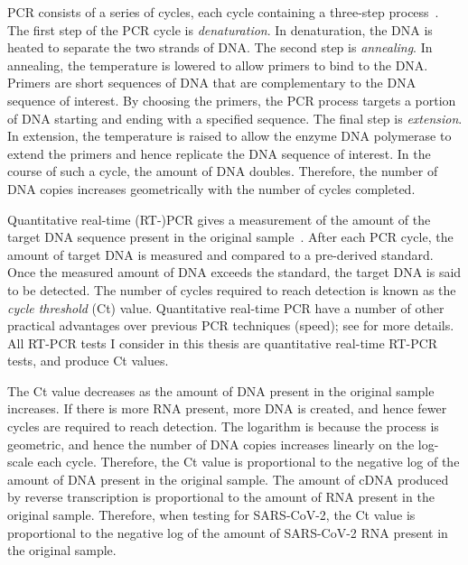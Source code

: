 \documentclass[thesis.tex]{subfiles}
\begin{document}
PCR consists of a series of cycles, each cycle containing a three-step process~\autocite{powledgePCR,garibyanPCR}.
The first step of the PCR cycle is \emph{denaturation}.
In denaturation, the DNA is heated to separate the two strands of DNA.
The second step is \emph{annealing}.
In annealing, the temperature is lowered to allow primers to bind to the DNA.
Primers are short sequences of DNA that are complementary to the DNA sequence of interest.
By choosing the primers, the PCR process targets a portion of DNA starting and ending with a specified sequence.
The final step is \emph{extension}.
In extension, the temperature is raised to allow the enzyme DNA polymerase to extend the primers and hence replicate the DNA sequence of interest.
In the course of such a cycle, the amount of DNA doubles.
Therefore, the number of DNA copies increases geometrically with the number of cycles completed.

Quantitative real-time (RT-)PCR gives a measurement of the amount of the target DNA sequence present in the original sample~\autocite{yangPCRdiagnostics}.
After each PCR cycle, the amount of target DNA is measured and compared to a pre-derived standard.
Once the measured amount of DNA exceeds the standard, the target DNA is said to be detected.
The number of cycles required to reach detection is known as the \emph{cycle threshold} (Ct) value.
Quantitative real-time PCR have a number of other practical advantages over previous PCR techniques (\eg speed); see \textcite{yangPCRdiagnostics,valasekPower} for more details.
All RT-PCR tests I consider in this thesis are quantitative real-time RT-PCR tests, and produce Ct values.

The Ct value decreases as the amount of DNA present in the original sample increases.
If there is more RNA present, more DNA is created, and hence fewer cycles are required to reach detection.
The logarithm is because the process is geometric, and hence the number of DNA copies increases linearly on the log-scale each cycle.
Therefore, the Ct value is proportional to the negative log of the amount of DNA present in the original sample.
The amount of cDNA produced by reverse transcription is proportional to the amount of RNA present in the original sample.
Therefore, when testing for SARS-CoV-2, the Ct value is proportional to the negative log of the amount of SARS-CoV-2 RNA present in the original sample.

\end{document}
